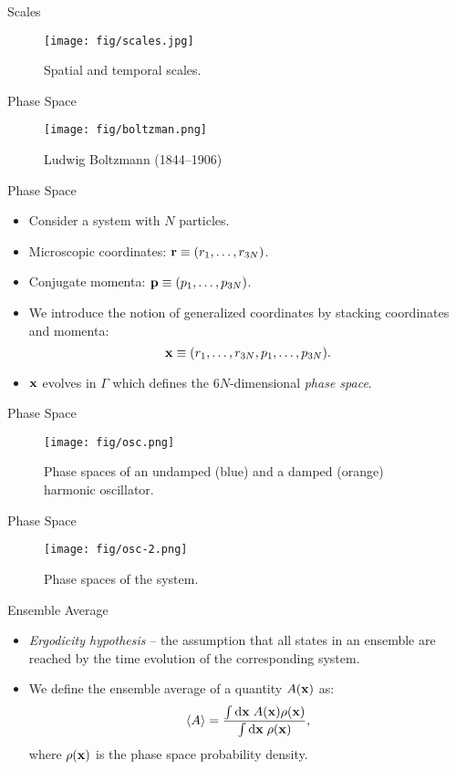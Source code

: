 \documentclass[10pt]{beamer}
\begin{document}
\begin{frame}{Scales}
\begin{figure}
  \texttt{[image: fig/scales.jpg]}
  \caption{Spatial and temporal scales.}
\end{figure}
\end{frame}

\begin{frame}{Phase Space}
\begin{figure}
  \texttt{[image: fig/boltzman.png]}
  \caption{Ludwig Boltzmann (1844--1906)}
\end{figure}
\end{frame}

\begin{frame}{Phase Space}
\begin{itemize}
\setlength\itemsep{1em}
  \item Consider a system with $N$ particles.
  \item Microscopic coordinates: ${\bf r} \equiv (r_1, \dots, r_{3N})$.
  \item Conjugate momenta: ${\bf p} \equiv (p_1, \dots, p_{3N})$.
  \item We introduce the notion of generalized coordinates by stacking coordinates and momenta:
  \begin{equation}
    {\bf x} \equiv (r_1, \dots, r_{3N}, p_1, \dots, p_{3N}).
  \end{equation}
  \item ${\bf x}$ evolves in $\Gamma$ which defines the $6N$-dimensional \textit{phase space}.
\end{itemize}
\end{frame}

\begin{frame}{Phase Space}
\begin{figure}
  \texttt{[image: fig/osc.png]}
  \caption{Phase spaces of an undamped (blue) and a damped (orange) harmonic oscillator.}
\end{figure}
\end{frame}

\begin{frame}{Phase Space}
\begin{figure}
  \texttt{[image: fig/osc-2.png]}
  \caption{Phase spaces of the system.}
\end{figure}
\end{frame}

\begin{frame}{Ensemble Average}
\begin{itemize}
\setlength\itemsep{1em}
  \item \textit{Ergodicity hypothesis} -- the assumption that all states in an ensemble are reached by the time evolution of the corresponding system.
  \item We define the ensemble average of a quantity $A({\bf x})$ as:
  \begin{equation}
    \left< A \right> = \frac{\int \mathrm{d}{\bf x}\; A({\bf x}) \rho({\bf x})}{\int \mathrm{d}{\bf x}\; \rho({\bf x})},
  \end{equation}
  where $\rho({\bf x})$ is the phase space probability density.
\end{itemize}
\end{frame}
\end{document}
